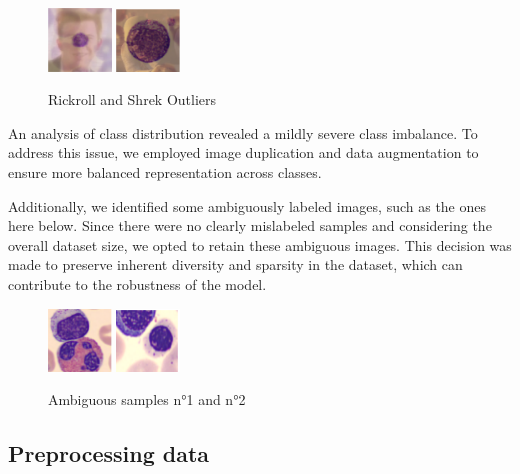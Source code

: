 \documentclass[11pt]{article}
\begin{document}
\begin{multicols}{2}
        \begin{figure}[H]
            \centering
            \includegraphics[width=0.15\textwidth]{images/outlier1.png}
            \includegraphics[width=0.15\textwidth]{images/outlier2.png}
            \caption{\small Rickroll and Shrek Outliers}
        \end{figure}
        
        
        An analysis of class distribution revealed a mildly severe class imbalance. To address this issue, we employed image duplication and data augmentation to ensure more balanced representation across classes.
        
        Additionally, we identified some ambiguously labeled images, such as the ones here below. Since there were no clearly mislabeled samples and considering the overall dataset size, we opted to retain these ambiguous images. This decision was made to preserve inherent diversity and sparsity in the dataset, which can contribute to the robustness of the model.
        
        \begin{figure}[H]
            \centering
            \includegraphics[width=0.15\textwidth]{images/ambiguous1.png}
            \includegraphics[width=0.15\textwidth]{images/ambiguous2.png}
            \caption{\small Ambiguous samples n°1 and n°2}
        \end{figure}
        
        
        \subsection{Preprocessing data}
        

\end{multicols}
\end{document}
